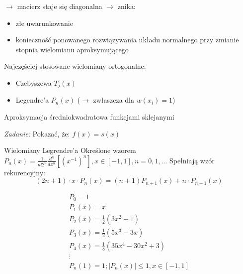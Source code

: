 \begin{frame}
	$\rightarrow$ macierz staje się diagonalna $\rightarrow$ znika:
    \begin{itemize}
    \item złe uwarunkowanie
    \item konieczność ponowanego rozwiązywania układu normalnego przy zmianie stopnia wielomianu aproksymującego
    \end{itemize}
	Najczęściej stosowane wielomiany ortogonalne:
    \begin{itemize}
    \item Czebyszewa $T_j(x)$
    \item Legendre'a $P_n(x)$ ($\rightarrow$ zwłaszcza dla $w(x_i) = 1$)
    \end{itemize}
\end{frame}
\begin{frame}{Aproksymacja średniokwadratowa funkcjami sklejanymi}
	\begin{flushright}
		\textit{Zadanie:} \quad Pokazać, że: $f(x) = s(x)$
	\end{flushright}
\end{frame}
\begin{frame}{Wielomiany Legrendre'a}
	Określone wzorem $P_n(x) = \frac{1}{n!2^n}\frac{d^n}{dx^n}[(x^{-1})^n],x \in [-1,1], n = 0,1,\ldots$
    Spełniają wzór rekurencyjny:
    $$(2n+1) \cdot x \cdot P_n(x)=(n+1)P_{n+1}(x)+n \cdot P_{n-1}(x)$$
    \begin{flushleft}
    	$$\left.\begin{array}{l}
    P_0 = 1 \\
    P_1(x) = x \\
    P_2(x) = \frac{1}{2}(3x^2-1)\\
    P_3(x) = \frac{1}{2}(5x^3-3x) \\
    P_4(x) = \frac{1}{8}(35x^4-30x^2+3)\\
    \vdots \\
    P_n(1) = 1; |P_n(x)| \leqslant 1, x \in [-1,1]
    \end{array}\right.$$
    \end{flushleft}
\end{frame}
